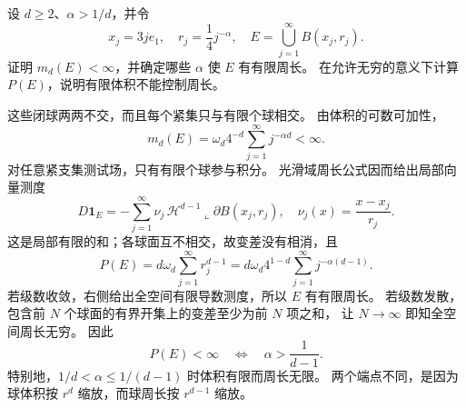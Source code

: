 \begin{exercise}\label{b1:ex:27-small-balls-perimeter-threshold}
设 \(d\ge2\)、\(\alpha>1/d\)，并令
\[
 x_j=3je_1,\quad r_j=\frac14j^{-\alpha},\quad
 E=\bigcup_{j=1}^\infty B(x_j,r_j).
\]
证明 \(m_d(E)<\infty\)，并确定哪些 \(\alpha\) 使 \(E\) 有有限周长。
在允许无穷的意义下计算 \(P(E)\)，说明有限体积不能控制周长。
\end{exercise}
\begin{solution}
这些闭球两两不交，而且每个紧集只与有限个球相交。
由体积的可数可加性，
\[
 m_d(E)=\omega_d4^{-d}\sum_{j=1}^\infty j^{-\alpha d}<\infty.
\]
对任意紧支集测试场，只有有限个球参与积分。
光滑域周长公式因而给出局部向量测度
\[
 D\mathbf1_E
 =-\sum_{j=1}^\infty
      \nu_j\,\mathcal H^{d-1}\!\llcorner\partial B(x_j,r_j),
 \quad \nu_j(x)=\frac{x-x_j}{r_j}.
\]
这是局部有限的和；各球面互不相交，故变差没有相消，且
\[
 P(E)=d\omega_d\sum_{j=1}^\infty r_j^{d-1}
     =d\omega_d4^{1-d}\sum_{j=1}^\infty j^{-\alpha(d-1)}.
\]
若级数收敛，右侧给出全空间有限导数测度，所以 \(E\) 有有限周长。
若级数发散，包含前 \(N\) 个球面的有界开集上的变差至少为前 \(N\) 项之和，
让 \(N\to\infty\) 即知全空间周长无穷。
因此
\[
 P(E)<\infty\quad\Longleftrightarrow\quad
       \alpha>\frac1{d-1}.
\]
特别地，\(1/d<\alpha\le1/(d-1)\) 时体积有限而周长无限。
两个端点不同，是因为球体积按 \(r^d\) 缩放，而球周长按 \(r^{d-1}\) 缩放。
\end{solution}

